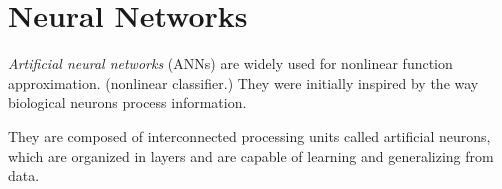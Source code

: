 \documentclass[../main.tex]{subfiles}
\begin{document}
	\chapter{Neural Networks} \label{ch:neural}
	
	
	\noindent \textit{Artificial neural networks} (ANNs) are widely used for nonlinear function approximation.
	(nonlinear classifier.)  They were initially inspired by the way biological neurons process information. 
	
	They are composed of interconnected processing units called artificial neurons, which are organized in layers and are capable of learning and generalizing from data.	
	
	
\end{document}
